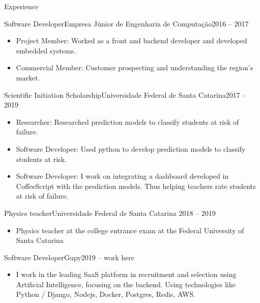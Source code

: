 \documentclass[]{mcdowellcv}
\begin{document}
	\makeheader
	\begin{cvsection}{Experience}
		\begin{cvsubsection}{Software Developer}{Empresa Júnior de Engenharia de Computação}{2016 -- 2017}
			~\\
			\begin{itemize}
				\item Project Member: Worked as a front and backend developer and developed embedded systems.
				\item Commercial Member: Customer prospecting and understanding the region's market.
			\end{itemize}
		\end{cvsubsection}

		\begin{cvsubsection}{Scientific Initiation Scholarship}{Universidade Federal de Santa Catarina}{2017 -- 2019}
			\begin{itemize}
				\item Researcher: Researched prediction models to classify students at risk of failure.
				\item Software Developer: Used python to develop prediction models to classify students at risk.
				\item Software Developer: I work on integrating a dashboard developed in CoffeeScript with the prediction models. Thus helping teachers rate students at risk of failure.
			\end{itemize}
		\end{cvsubsection}

		\begin{cvsubsection}{Physics teacher}{Universidade Federal de Santa Catarina}{ 2018 -- 2019}
			\begin{itemize}
				\item Physics teacher at the college entrance exam at the Federal University of Santa Catarina
			\end{itemize}
		\end{cvsubsection}

    \begin{cvsubsection}{Software Developer}{Gupy}{2019 -- work here}
			\begin{itemize}
				\item I work in the leading SaaS platform in recruitment and selection using Artificial Intelligence, focusing on the backend. Using technologies like Python / Django, Nodejs, Docker, Postgres, Redis, AWS.
			\end{itemize}
		\end{cvsubsection}

	\end{cvsection}
\end{document}
